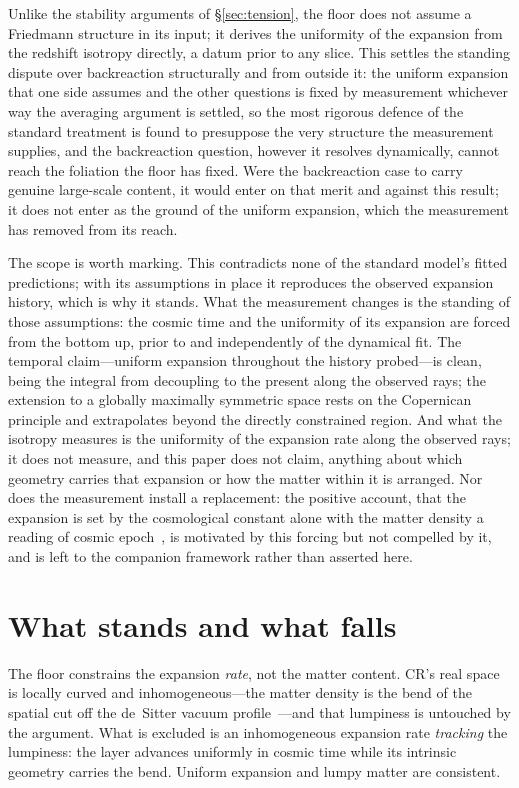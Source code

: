 \documentclass[11pt,a4paper]{article}
\begin{document}
Unlike the stability arguments of \S\ref{sec:tension}, the floor does not assume a Friedmann structure in its input; it derives the uniformity of the expansion from the redshift isotropy directly, a datum prior to any slice. This settles the standing dispute over backreaction structurally and from outside it: the uniform expansion that one side assumes and the other questions is fixed by measurement whichever way the averaging argument is settled, so the most rigorous defence of the standard treatment is found to presuppose the very structure the measurement supplies, and the backreaction question, however it resolves dynamically, cannot reach the foliation the floor has fixed. Were the backreaction case to carry genuine large-scale content, it would enter on that merit and against this result; it does not enter as the ground of the uniform expansion, which the measurement has removed from its reach.

The scope is worth marking. This contradicts none of the standard model's fitted predictions; with its assumptions in place it reproduces the observed expansion history, which is why it stands. What the measurement changes is the standing of those assumptions: the cosmic time and the uniformity of its expansion are forced from the bottom up, prior to and independently of the dynamical fit. The temporal claim---uniform expansion throughout the history probed---is clean, being the integral from decoupling to the present along the observed rays; the extension to a globally maximally symmetric space rests on the Copernican principle and extrapolates beyond the directly constrained region. And what the isotropy measures is the uniformity of the expansion rate along the observed rays; it does not measure, and this paper does not claim, anything about which geometry carries that expansion or how the matter within it is arranged. Nor does the measurement install a replacement: the positive account, that the expansion is set by the cosmological constant alone with the matter density a reading of cosmic epoch~\cite{JanzenCRframework}, is motivated by this forcing but not compelled by it, and is left to the companion framework rather than asserted here.

\section{What stands and what falls}\label{sec:stands}

The floor constrains the expansion \emph{rate}, not the matter content. CR's real space is locally curved and inhomogeneous---the matter density is the bend of the spatial cut off the de~Sitter vacuum profile~\cite{JanzenOperator, JanzenRange}---and that lumpiness is untouched by the argument. What is excluded is an inhomogeneous expansion rate \emph{tracking} the lumpiness: the layer advances uniformly in cosmic time while its intrinsic geometry carries the bend. Uniform expansion and lumpy matter are consistent.
\end{document}
